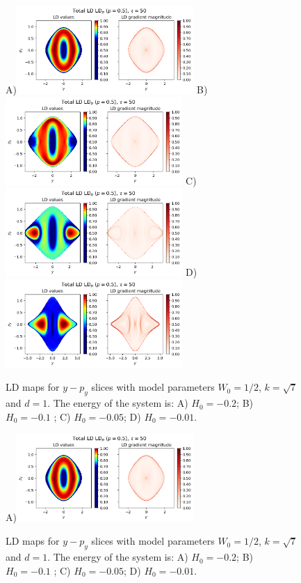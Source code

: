\documentclass[10pt,aps,onecolumn,superscriptaddress]{revtex4-2}
\begin{document}
\begin{figure}
    \centering
    A)\includegraphics[width=0.6\textwidth]{LD_H0_-0_2_y-py_PES_bifurcation.png}
    B)\includegraphics[width=0.6\textwidth]{LD_H0_-0_1_y-py_PES_bifurcation.png}
    C)\includegraphics[width=0.6\textwidth]{LD_H0_-0_05_y-py_PES_bifurcation.png}
    D)\includegraphics[width=0.6\textwidth]{LD_H0_-0_01_y-py_PES_bifurcation.png}
    \caption{LD maps for $y-p_y$ slices with model parameters $W_0 = 1/2$, $k = \sqrt{7}$ and $d = 1$. The energy of the system is: A) $H_0 = -0.2$; B) $H_0 = -0.1$ ; C) $H_0 = -0.05$; D) $H_0 = -0.01$.}
\end{figure}

\begin{figure}
    \centering
    A)\includegraphics[width=0.6\textwidth]{LD_H0_-0_2_y-py_PES_bifurcation}
    \caption{LD maps for $y-p_y$ slices with model parameters $W_0 = 1/2$, $k = \sqrt{7}$ and $d = 1$. The energy of the system is: A) $H_0 = -0.2$; B) $H_0 = -0.1$ ; C) $H_0 = -0.05$; D) $H_0 = -0.01$.}
\end{figure}
\end{document}

